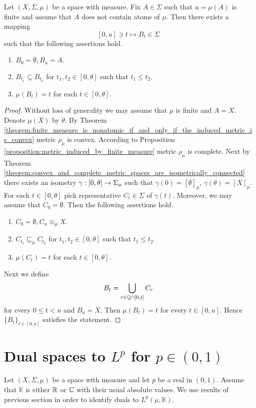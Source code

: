 \begin{corollary}\label{corollary:nonatomic_measure_admits_isometrical_intervals}
  Let $(X,\Sigma,\mu)$ be a space with measure. Fix $A \in \Sigma$ such that $u = \mu(A)$ is finite and assume that $A$ does not contain atoms of $\mu$. Then there exists a mapping
  $$[0,u] \ni t \mapsto B_t \in \Sigma$$
  such that the following assertions hold.
  \begin{enumerate}[label=\emph{\textbf{(\arabic*)}}, leftmargin=*]
    \item $B_0 = \emptyset, B_{u} = A$.
    \item $B_{t_1} \subseteq B_{t_2}$ for $t_1,t_2 \in [0,\theta]$ such that $t_1 \leq t_2$.
    \item $\mu(B_t) = t$ for each $t \in [0,\theta]$.
  \end{enumerate} 
\end{corollary}
\begin{proof}
  Without loss of generality we may assume that $\mu$ is finite and $A = X$. Denote $\mu(X)$ by $\theta$. By Theorem \ref{theorem:finite_measure_is_nonatomic_if_and_only_if_the_induced_metric_is_convex} metric $\rho_{\mu}$ is convex. According to Proposition \ref{proposition:metric_induced_by_finite_measure} metric $\rho_{\mu}$ is complete. Next by Theorem \ref{theorem:convex_and_complete_metric_spaces_are_isometrically_connected} there exists an isometry $\gamma:[0,\theta] \rightarrow \Sigma_{\mu}$ such that $\gamma(0) = [\emptyset]_{\mu},\,\gamma\left(\theta\right) = [X]_{\mu}$. For each $t \in [0,\theta]$ pick representative $C_t \in \Sigma$ of $\gamma(t)$. Moreover, we may assume that $C_0 = \emptyset$. Then the following assertions hold.
  \begin{enumerate}[label=\emph{\textbf{(\arabic*)}}, leftmargin=*]
    \item $C_0 = \emptyset, C_{u} \equiv_{\mu} X$.
    \item $C_{t_1} \sqsubseteq_{\mu} C_{t_2}$ for $t_1,t_2 \in [0,\theta]$ such that $t_1 \leq t_2$.
    \item $\mu(C_t) = t$ for each $t \in [0,\theta]$.
  \end{enumerate} 
  Next we define
  $$B_t = \bigcup_{r \in {\mathbb Q} \cap [0,t]}C_r$$
  for every $0 \leq t < u$ and $B_u = X$. Then $\mu(B_t) = t$ for every $t \in [0,u]$. Hence $\{B_t\}_{t\in [0,u]}$ satisfies the statement.
\end{proof}


\section{Dual spaces to $L^p$ for $p \in (0,1)$}
\noindent
Let $(X,\Sigma,\mu)$ be a space with measure and let $p$ be a real in $(0, 1)$. Assume that $\mathbb{K}$ is either ${\mathbb R}$ or ${\mathbb C}$ with their usual absolute values. We use results of previous section in order to identify duals to $L^p(\mu,\mathbb{K})$.


\small




